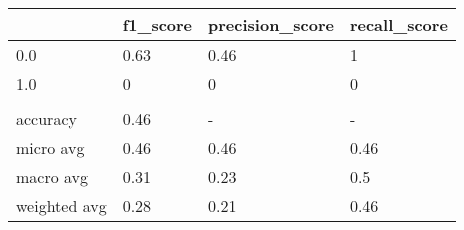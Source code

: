 \begin{tabular}{llll}
\toprule
{} & f1\_score & precision\_score & recall\_score \\
\midrule
0.0          &     0.63 &            0.46 &            1 \\
1.0          &        0 &               0 &            0 \\
             &          &                 &              \\
accuracy     &     0.46 &               - &            - \\
micro avg    &     0.46 &            0.46 &         0.46 \\
macro avg    &     0.31 &            0.23 &          0.5 \\
weighted avg &     0.28 &            0.21 &         0.46 \\
\bottomrule
\end{tabular}
